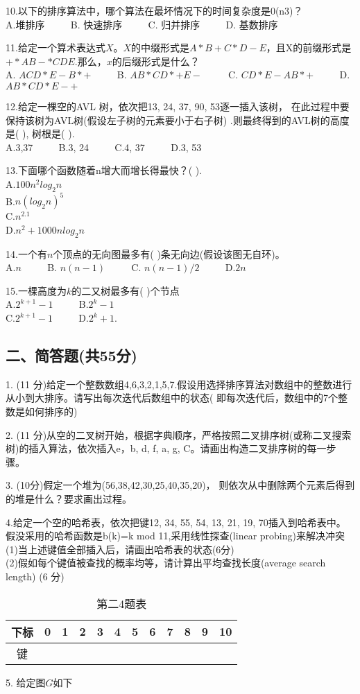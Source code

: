 10.以下的排序算法中，哪个算法在最坏情况下的时间复杂度是0(n3)？ \\
A.堆排序  $\qquad$ B. 快速排序  $\qquad$ C. 归并排序 $\qquad$ D. 基数排序

11.给定一个算术表达式$X$。$X$的中缀形式是$A*B+C*D-E$，且X的前缀形式是$+*AB-*CDE$.那么，$x$的后缀形式是什么？ \\
A. $ACD*E-B*+$ $\qquad$ B. $AB*CD*+E-$ $\qquad$ C. $CD*E-AB*+$ $\qquad$ D. $AB*CD*E-+$

12.给定一棵空的AVL 树，依次把13, 24, 37, 90, 53逐一插入该树， 在此过程中要保持该树为AVL树(假设左子树的元素要小于右子树) .则最终得到的AVL树的高度是( ), 树根是( ). \\
A.3,37 $\qquad$ B.3, 24 $\qquad$ C.4, 37 $\qquad$ D.3, 53

13.下面哪个函数随着n增大而增长得最快？( ). \\
A.$100n^2log_2n$ \\
B.$n(log_2n)^5$ \\
C.$n^{2.1}$ \\
D.$n^2+1000nlog_2n$

14.一个有$n$个顶点的无向图最多有( )条无向边(假设该图无自环)。 \\
A.$n$ $\qquad$ B. $n(n-1)$ $\qquad$ C. $n(n-1)/2$ $\qquad$ D.$2n$

15.一棵高度为$k$的二又树最多有( )个节点 \\
A.$2^{k+1}-1$ $\qquad$ B.$2^k-1$ \\
C.$2^{k+1}-1$ $\qquad$ D.$2^k+1$.

\subsection{二、简答题(共55分)}
1. (11 分)给定一个整数数组{4,6,3,2,1,5,7}.假设用选择排序算法对数组中的整数进行从小到大排序。请写出每次迭代后数组中的状态( 即每次迭代后，数组中的7个整数是如何排序的)

2. (11 分)从空的二叉树开始，根据字典顺序，严格按照二叉排序树(或称二叉搜索树)的插入算法，依次插入e，b, d, f, a, g, C。请画出构造二叉排序树的每一步骤。

3. (10分)假定一个堆为(56,38,42,30,25,40,35,20)， 则依次从中删除两个元素后得到的堆是什么？要求画出过程。

4.给定一个空的哈希表，依次把键12, 34, 55, 54, 13, 21, 19, 70插入到哈希表中。假没采用的哈希函数是b(k)=k mod 11,采用线性探查(linear probing)来解决冲突 \\
(1)当上述键值全部插入后，请画出哈希表的状态(6分) \\
(2)假如每个键值被查找的概率均等，请计算出平均查找长度(average search length) (6 分)
\begin{table}[ht]
\centering
\caption{第二4题表}\label{SYDS15_tab1}
\begin{tabular}{|c|c|c|c|c|c|c|c|c|c|c|}
\hline
下标 & 0 & 1 & 2 & 3 & 4 & 5 & 6 & 7 & 8 & 9 & 10 \\
\hline
键 &  &  &  &  &  &  &  &  &  &  & \\
\hline
\end{tabular}
\end{table}

5. 给定图$G$如下 \\
